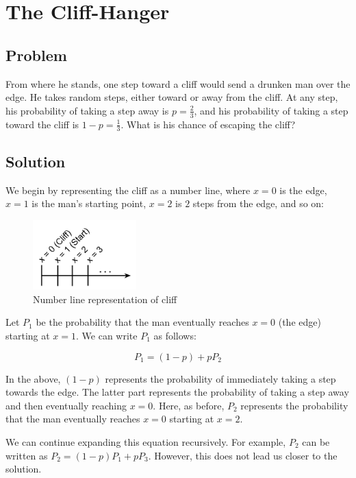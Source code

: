 \documentclass{article}
\date{}
\author{Kaan Aksoy | March 9, 2020}
\begin{document}
\maketitle
\section{The Cliff-Hanger}
\subsection{Problem}

From where he stands, one step toward a cliff would send a drunken 
man over the edge.  He takes random steps, either toward or away 
from the cliff. At any step, his probability of taking a step away 
is $p=\frac{2}{3}$, and his probability of taking a step toward 
the cliff is $1-p=\frac{1}{3}$. What is his chance of escaping 
the cliff?

\subsection{Solution}

We begin by representing the cliff as a number line, where $x=0$ is 
the edge, $x=1$ is the man's starting point, $x=2$ is $2$ steps 
from the edge, and so on:

\begin{figure}[h]
    \centering
    \includegraphics[width=4cm]{Problem35_CliffHanger.png}
    \caption{Number line representation of cliff}
\end{figure}

Let $P_1$ be the probability that the man eventually reaches $x=0$ 
(the edge) starting at $x=1$. We can write $P_1$ as follows:

$$P_1 = (1-p) + pP_2$$

In the above, $(1-p)$ represents the probability of immediately taking 
a step towards the edge. The latter part represents the probability of 
taking a step away and then eventually reaching $x=0$. Here, as before, 
$P_2$ represents the probability that the man eventually reaches $x=0$ 
starting at $x=2$.

We can continue expanding this equation recursively. For example, $P_2$ 
can be written as $P_2 = (1-p)P_1 + pP_3$. However, this does not lead 
us closer to the solution.
\end{document}
